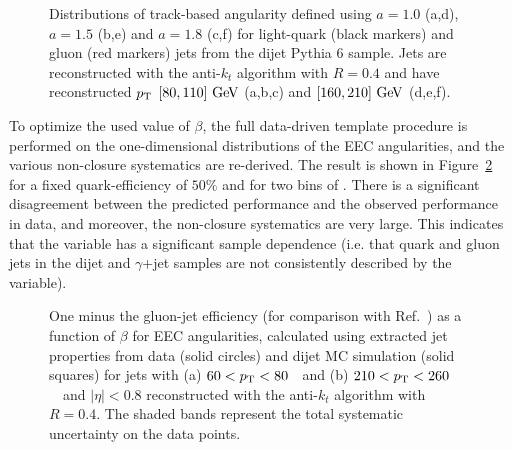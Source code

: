 \begin{figure}[!h]
	\centering

	\caption{ Distributions of track-based angularity defined using $a=1.0$ (a,d), $a=1.5$ (b,e) and
	  $a=1.8$ (c,f) for light-quark (black markers) and gluon (red markers) jets from the dijet 
	  Pythia 6 sample. Jets are reconstructed with the anti-$k_t$ algorithm with $R=0.4$ and
	  have reconstructed $p_{\text{T}}$ $[80,110] \GeV$ (a,b,c) and $[160,210] \GeV$ (d,e,f). }
	\label{fig:angularity}
\end{figure}

To optimize the used value of $\beta$, the full data-driven template procedure is performed on the one-dimensional distributions of the EEC angularities, and the various non-closure systematics are re-derived. The result is shown in Figure~\ref{fig:jet-reconstruction:qg:angSummary} for a fixed quark-efficiency of $50\%$ and for two bins of \pt. There is a significant disagreement between the predicted performance and the observed performance in data, and moreover, the non-closure systematics are very large. This indicates that the variable has a significant sample dependence (i.e. that quark and gluon jets in the dijet and $\gamma$+jet samples are not consistently described by the variable). 

\begin{figure}[htp]
\begin{center}
\caption{ 
One minus the gluon-jet efficiency (for comparison with Ref.~\cite{EEC}) as a function of 
$\beta$ for EEC angularities, calculated using extracted jet properties from 
data (solid circles) and dijet  MC simulation (solid squares) for jets with (a) $60<p_{\text{T}}<80$~\GeV\
and (b) $210<p_{\text{T}}<260$~\GeV\ and $|\eta|<0.8$ reconstructed with the anti-$k_t$ algorithm with $R=0.4$. 
The shaded bands represent the total systematic uncertainty on the data points.
}
\label{fig:jet-reconstruction:qg:angSummary}
\end{center}
\end{figure}

